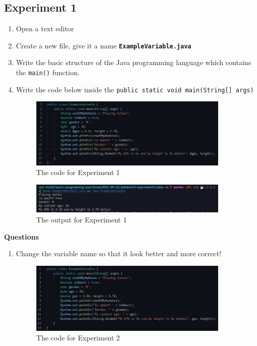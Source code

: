 \documentclass[12pt,titlepage]{article}
\begin{document}
\subsection{Experiment 1}
\begin{enumerate}
    \item Open a text editor
    \item Create a new file, give it a name \texttt{\textbf{ExampleVariable.java}}
    \item Write the basic structure of the Java programming language which contains the \texttt{main()} function.
    \item { 
        Write the code below inside the \texttt{public static void main(String[] args)}
        
        \begin{figure}[h]
            \centering
            \includegraphics[width=0.9\textwidth]{./images/variable-code.png}
            \caption{The code for Experiment 1}
        \end{figure}
        \begin{figure}[h]
            \centering
            \includegraphics[width=0.9\textwidth]{./images/variable-output.png}
            \caption{The output for Experiment 1}
        \end{figure}
    }
\end{enumerate}
\pagebreak
\textbf{Questions}
\begin{enumerate}
    \item { 
        Change the variable name so that it look better and more correct!

        \begin{figure}[h]
            \centering
            \includegraphics[width=0.9\textwidth]{./images/variable-code-updated.png}
            \caption{The code for Experiment 2}
        \end{figure}
    }
\end{enumerate}
\end{document}
